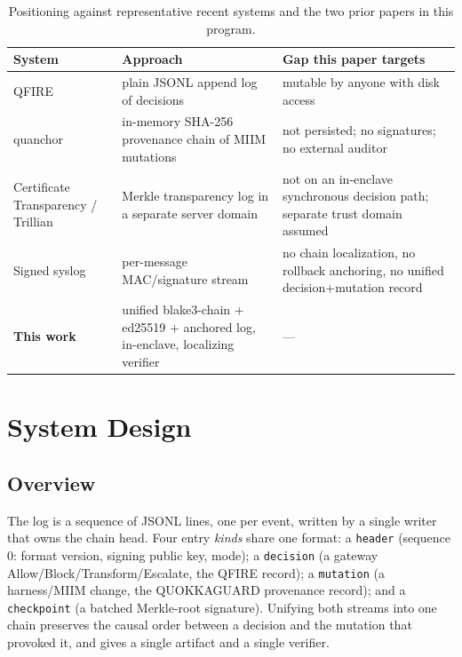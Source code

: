 \documentclass[11pt]{article}
\begin{document}
\begin{table}[htb]\centering\small
\begin{tabular}{L{3.0cm}L{4.3cm}L{4.3cm}}
\toprule
System & Approach & Gap this paper targets \\
\midrule
QFIRE~\cite{schwoebel2026qfire} & plain JSONL append log of decisions & mutable by anyone with disk access \\
quanchor~\cite{pristineweights2026} & in-memory SHA-256 provenance chain of MIIM mutations & not persisted; no signatures; no external auditor \\
Certificate Transparency / Trillian~\cite{rfc6962,trillian} & Merkle transparency log in a separate server domain & not on an in-enclave synchronous decision path; separate trust domain assumed \\
Signed syslog~\cite{rsyslogsign} & per-message MAC/signature stream & no chain localization, no rollback anchoring, no unified decision+mutation record \\
\textbf{This work} & unified blake3-chain + ed25519 + anchored log, in-enclave, localizing verifier & --- \\
\bottomrule
\end{tabular}
\caption{Positioning against representative recent systems and the two prior papers
in this program.}
\label{tab:related}
\end{table}

\section{System Design}\label{sec:design}
\subsection{Overview}
The log is a sequence of JSONL lines, one per event, written by a single writer
that owns the chain head. Four entry \emph{kinds} share one format: a
\texttt{header} (sequence 0: format version, signing public key, mode); a
\texttt{decision} (a gateway Allow/Block/Transform/Escalate, the QFIRE record); a
\texttt{mutation} (a harness/MIIM change, the QUOKKAGUARD provenance record); and a
\texttt{checkpoint} (a batched Merkle-root signature). Unifying both streams into
one chain preserves the causal order between a decision and the mutation that
provoked it, and gives a single artifact and a single verifier.
\end{document}
